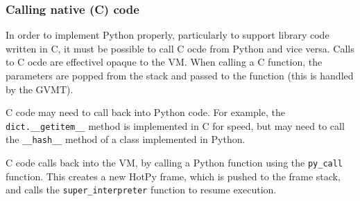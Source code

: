 \subsubsection{Calling native (C) code}
In order to implement Python properly, particularly to support library code written in C, it must be possible to call C ocde from Python and vice versa. Calls to C ocde are effectivel opaque to the VM. When calling a C function, the parameters are popped from the stack and passed to the function (this is handled by the GVMT).

C code may need to call back into Python code. For example, the \verb|dict.__getitem__| method is implemented in C for speed, but may need to call the \verb|__hash__| method of a class implemented in Python.

C code calls back into the VM, by calling a Python function using the \verb|py_call| function. This creates a new HotPy frame, which is pushed to the frame stack, and calls the \verb|super_interpreter| function to resume execution.


